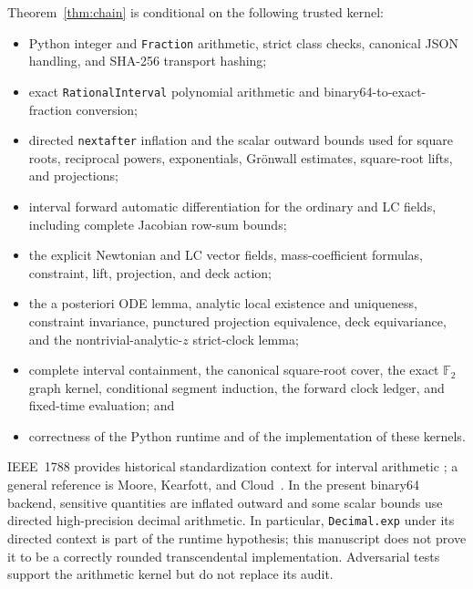 \documentclass[11pt]{article}
\newcommand{\Ftwo}{\mathbb{F}_2}
\begin{document}
Theorem~\ref{thm:chain} is conditional on the following trusted kernel:
\begin{itemize}
\item Python integer and \texttt{Fraction} arithmetic, strict class checks,
      canonical JSON handling, and SHA-256 transport hashing;
\item exact \texttt{RationalInterval} polynomial arithmetic and
      binary64-to-exact-fraction conversion;
\item directed \texttt{nextafter} inflation and the scalar outward bounds
      used for square roots, reciprocal powers, exponentials, Gr\"onwall
      estimates, square-root lifts, and projections;
\item interval forward automatic differentiation for the ordinary and LC
      fields, including complete Jacobian row-sum bounds;
\item the explicit Newtonian and LC vector fields, mass-coefficient formulas,
      constraint, lift, projection, and deck action;
\item the a posteriori ODE lemma, analytic local existence and uniqueness,
      constraint invariance, punctured projection equivalence, deck
      equivariance, and the nontrivial-analytic-$z$ strict-clock lemma;
\item complete interval containment, the canonical square-root cover, the
      exact $\Ftwo$ graph kernel, conditional segment induction, the forward
      clock ledger, and fixed-time evaluation; and
\item correctness of the Python runtime and of the implementation of these
      kernels.
\end{itemize}
IEEE~1788 provides historical standardization context for interval arithmetic
\cite{IEEE1788_2015}; a general reference is
Moore, Kearfott, and Cloud~\cite{MooreKearfottCloud2009}.  In the present
binary64 backend, sensitive quantities are inflated outward and some scalar
bounds use directed high-precision decimal arithmetic.  In particular,
\texttt{Decimal.exp} under its directed context is part of the runtime
hypothesis; this manuscript does not prove it to be a correctly rounded
transcendental implementation.  Adversarial tests support the arithmetic
kernel but do not replace its audit.
\end{document}
